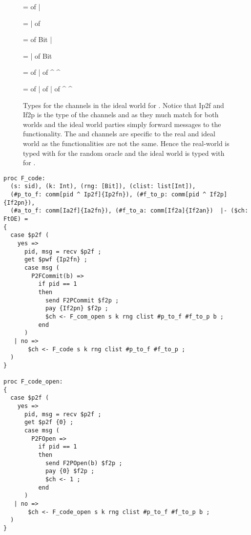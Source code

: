 \begin{figure}
\centering
{}  =  of  | 

  =  |  of 

  =  of Bit | 

  =  |  of Bit

  =  of  |  of  \textasciicircum {} \textasciicircum {}

  =  of  |  of  |  of  \textasciicircum {} \textasciicircum {}

\caption{Types for the channels in the ideal world for \Fcom. Notice that Ip2f and If2p is the type of the channels  and  as they much match for both worlds and the ideal world parties simply forward messages to the functionality. The  and  channels are specific to the real and ideal world as the functionalities are not the same. Hence the real-world  is typed with  for the random oracle and the ideal world  is typed with  for \Fcom.}
\label{fig:fcomtypes}
\end{figure}

\begin{figure*}
\begin{lstlisting}[basicstyle=\small\BeraMonottFamily]
proc F_code:
  (s: sid), (k: Int), (rng: [Bit]), (clist: list[Int]),
  (#p_to_f: comm[pid ^ Ip2f]{Ip2fn}), (#f_to_p: comm[pid ^ If2p]{If2pn}),
  (#a_to_f: comm[Ia2f]{Ia2fn}), (#f_to_a: comm[If2a]{If2an})  |- ($ch: FtOE) =
{
  case $p2f (
    yes =>	
      pid, msg = recv $p2f ;
      get $pwf {Ip2fn} ;
      case msg (
        P2FCommit(b) =>	
          if pid == 1
          then
            send F2PCommit $f2p ;
            pay {If2pn} $f2p ;
            $ch <- F_com_open s k rng clist #p_to_f #f_to_p b ;
          end
      )
   | no =>  
       $ch <- F_code s k rng clist #p_to_f #f_to_p ;
  )
}

proc F_code_open:
{
  case $p2f (
    yes =>	
      pid, msg = recv $p2f ;
      get $p2f {0} ;
      case msg (
        P2FOpen =>	
          if pid == 1
          then
            send F2POpen(b) $f2p ;
            pay {0} $f2p ;
            $ch <- 1 ;
          end
      )
   | no =>
       $ch <- F_code_open s k rng clist #p_to_f #f_to_p b ;
  )
}
\end{lstlisting}
\end{figure*}

